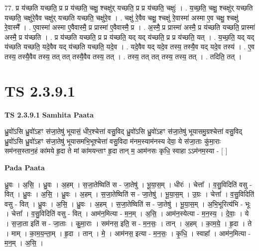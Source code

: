 \documentclass[17pt]{extarticle}
\begin{document}
77. प्र य॑च्छति यच्छति॒ प्र प्र य॑च्छति॒ चक्षु॒ श्चक्षु॑र् यच्छति॒ प्र प्र य॑च्छति॒ चक्षुः॑ । . य॒च्छ॒ति॒ चक्षु॒ श्चक्षु॑र् यच्छति यच्छति॒ चक्षु॑रे॒वैव चक्षु॑र् यच्छति यच्छति॒ चक्षु॑रे॒व । . चक्षु॑ रे॒वैव चक्षु॒ श्चक्षु॑ रे॒वास्मा॑ अस्मा ए॒व चक्षु॒ श्चक्षु॑ रे॒वास्मै᳚ । . ए॒वास्मा॑ अस्मा ए॒वैवास्मै॒ प्र प्रास्मा॑ ए॒वैवास्मै॒ प्र । . अ॒स्मै॒ प्र प्रास्मा॑ अस्मै॒ प्र य॑च्छति यच्छति॒ प्रास्मा॑ अस्मै॒ प्र य॑च्छति । . प्र य॑च्छति यच्छति॒ प्र प्र य॑च्छति॒ यद् यद् य॑च्छति॒ प्र प्र य॑च्छति॒ यत् । . य॒च्छ॒ति॒ यद् यद् य॑च्छति यच्छति॒ यदे॒वैव यद् य॑च्छति यच्छति॒ यदे॒व । . यदे॒वैव यद् यदे॒व तस्य॒ तस्यै॒व यद् यदे॒व तस्य॑ । . ए॒व तस्य॒ तस्यै॒वैव तस्य॒ तत् तत् तस्यै॒वैव तस्य॒ तत् । . तस्य॒ तत् तत् तस्य॒ तस्य॒ तत् । . तदिति॒ तत् । \newline
\pagebreak
{}

\section{ TS 2.3.9.1 }

\textbf{TS 2.3.9.1 } \newline
\textbf{Samhita Paata} \newline

ध्रु॒वो॑ऽसि ध्रु॒वो॑ऽहꣳ स॑जा॒तेषु॑ भूयासं॒ धीर॒श्चेत्ता॑ वसु॒विद् ध्रु॒वो॑ऽसि ध्रु॒वो॑ऽहꣳ स॑जा॒तेषु॑ भूयासमु॒ग्रश्चेत्ता॑ वसु॒विद् ध्रु॒वो॑ऽसि ध्रु॒वो॑ऽहꣳ स॑जा॒तेषु॑ भूयासमभि॒भूश्चेत्ता॑ वसु॒विदा म॑नम॒स्याम॑नस्य देवा॒ ये स॑जा॒ताः कु॑मा॒राः सम॑नस॒स्तान॒हं का॑मये हृ॒दा ते मां का॑मयन्ताꣳ हृ॒दा तान् म॒ आम॑नसः कृधि॒ स्वाहा ऽऽम॑नम॒स्या - [  ] \newline

\textbf{Pada Paata} \newline

ध्रु॒वः । अ॒सि॒ । ध्रु॒वः । अ॒हम् । स॒जा॒तेष्विति॑ स - जा॒तेषु॑ । भू॒या॒स॒म् । धीरः॑ । चेत्ता᳚ । व॒सु॒विदिति॑ वसु - वित् । ध्रु॒वः । अ॒सि॒ । ध्रु॒वः । अ॒हम् । स॒जा॒तेष्विति॑ स - जा॒तेषु॑ । भू॒या॒स॒म् । उ॒ग्रः । चेत्ता᳚ । व॒सु॒विदिति॑ वसु - वित् । ध्रु॒वः । अ॒सि॒ ।  ध्रु॒वः । अ॒हम् । स॒जा॒तेष्विति॑ स - जा॒तेषु॑ । भू॒या॒स॒म् । अ॒भि॒भूरित्य॑भि - भूः । चेत्ता᳚ । व॒सु॒विदिति॑ वसु - वित् । आम॑न॒मित्या - म॒न॒म् । अ॒सि॒ । आम॑न॒स्येत्या - म॒न॒स्य॒ । दे॒वाः॒ । ये ।  स॒जा॒ता इति॑ स - जा॒ताः । कु॒मा॒राः । सम॑नस॒ इति॒ स - म॒न॒सः॒ । तान् । अ॒हम् । का॒म॒ये॒ । हृ॒दा । ते । माम् । का॒म॒य॒न्ता॒म् । हृ॒दा । तान् । मे॒ । आम॑नस॒ इत्या - म॒न॒सः॒ । कृ॒धि॒ । स्वाहा᳚ । आम॑न॒मित्या - म॒न॒म् । अ॒सि॒ ।  \newline
\end{document}
